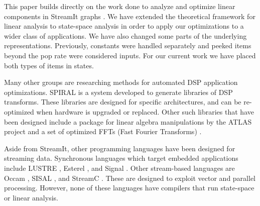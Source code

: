 
    This paper builds directly on the work done to analyze and
optimize linear components in StreamIt graphs \cite{Lamb}. We have
extended the theoretical framework for linear analysis to
state-space analysis in order to apply our optimizations to a
wider class of applications. We have also changed some parts of
the underlying representations. Previously, constants were handled
separately and peeked items beyond the pop rate were considered
inputs. For our current work we have placed both types of items in
states.

    Many other groups are researching methods for automated DSP
application optimizations. SPIRAL \cite{Spiral} is a system
developed to generate libraries of DSP transforms. These libraries
are designed for specific architectures, and can be re-optimized
when hardware is upgraded or replaced. Other such libraries that
have been designed include a package for linear algebra
manipulations by the ATLAS project \cite{Atlas} and a set of
optimized FFTs (Fast Fourier Transforms) \cite{fftw}.

    Aside from StreamIt, other programming languages have been
designed for streaming data. Synchronous languages which target
embedded applications include LUSTRE \cite{Lustre}, Esterel
\cite{Esterel}, and Signal \cite{Signal}. Other stream-based
languages are Occam \cite{Occam}, SISAL \cite{sisal}, and StreamC
\cite{streamc}. These are designed to exploit vector and parallel
processing. However, none of these languages have compilers that
run state-space or linear analysis.
